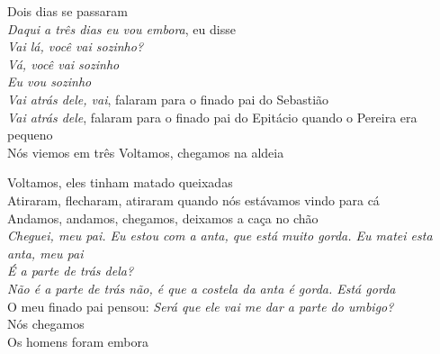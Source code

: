 \noindent   Dois dias se passaram\\
  \textit{Daqui a três dias eu vou embora}, eu disse\\
  \textit{Vai lá, você vai sozinho?}\\
  \textit{Vá, você vai sozinho}\\
  \textit{Eu vou sozinho}\\
  \textit{Vai atrás dele, vai}, falaram para o finado pai do Sebastião\\
  \textit{Vai atrás dele}, falaram para o finado pai do Epitácio quando o Pereira era pequeno\\
  Nós viemos em três
  Voltamos, chegamos na aldeia
 
 \smallskip
 \begin{center}\end{center}
 \smallskip
 
\noindent   Voltamos, eles tinham matado queixadas\\
  Atiraram, flecharam, atiraram quando nós estávamos vindo para cá\\
  Andamos, andamos, chegamos, deixamos a caça no chão\\
  \textit{Cheguei, meu pai. Eu estou com a anta, que está muito gorda. Eu matei esta anta, meu pai}\\
  \textit{É a parte de trás dela?}\\
  \textit{Não é a parte de trás não, é que a costela da anta é gorda. Está gorda}\\
  O meu finado pai pensou: \textit{Será que ele vai me dar a parte do umbigo?}\\
  Nós chegamos\\
  Os homens foram embora

